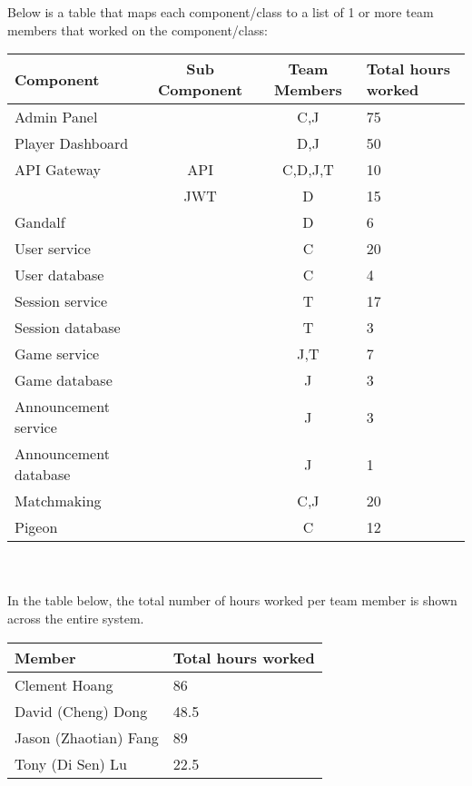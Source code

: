 \documentclass{article}
\begin{document}
Below is a table that maps each component/class to a list of 1 or more team members that worked on the component/class: \\
\begin{tabular}{ | l | c | c | l |  }
	\hline
    Component & Sub Component & Team Members & Total hours worked \\
    \hline
	Admin Panel & & C,J & 75 \\
	\hline
	Player Dashboard & & D,J & 50  \\
	\hline
	API Gateway & API & C,D,J,T & 10 \\
	& JWT & D & 15 \\
	\hline
	Gandalf & & D & 6  \\
	\hline
	User service & & C & 20 \\
	User database & & C & 4 \\
	\hline
	Session service & & T & 17 \\
	Session database & & T & 3 \\
	\hline
	Game service & & J,T & 7 \\
	Game database & & J & 3 \\
	\hline
	Announcement service & & J & 3 \\
	Announcement database & & J & 1 \\
	\hline
	Matchmaking & & C,J & 20 \\
	\hline
	Pigeon & & C & 12 \\
    \hline
\end{tabular} \\ \\

In the table below, the total number of hours worked per team member is shown across the entire system. \\
\begin{tabular}{ | l | l | }
	\hline
    Member & Total hours worked \\
    \hline
	Clement Hoang & 86 \\
	David (Cheng) Dong & 48.5 \\
	Jason (Zhaotian) Fang & 89 \\
	Tony (Di Sen) Lu & 22.5 \\
    \hline
\end{tabular}
\end{document}
